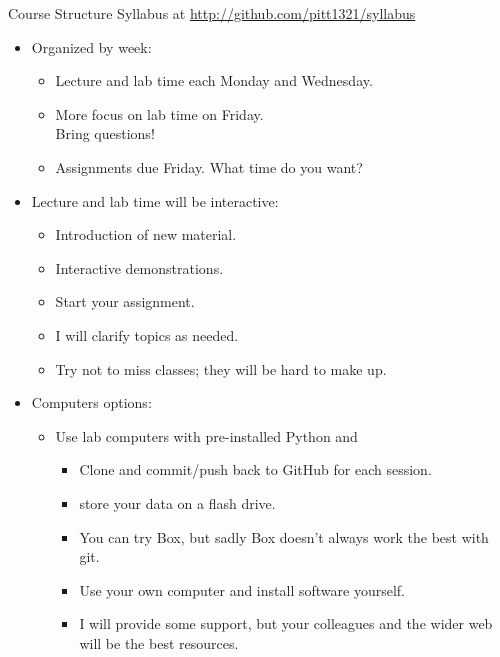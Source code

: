 \begin{frame}{Course Structure}
  Syllabus at \url{http://github.com/pitt1321/syllabus}
  \begin{itemize}
    \item Organized by week:
    \begin{itemize}
      \item Lecture and lab time each Monday and Wednesday.
      \item More focus on lab time on Friday.\\ Bring questions!
      \item Assignments due Friday.  What time do you want?
    \end{itemize}
    \item Lecture and lab time will be interactive:
    \begin{itemize}
      \item Introduction of new material.
      \item Interactive demonstrations.
      \item Start your assignment.
      \item I will clarify topics as needed.
      \item Try not to miss classes; they will be hard to make up.
    \end{itemize}
    \item Computers options:
    \begin{itemize}
      \item Use lab computers with pre-installed Python and 
      \begin{itemize}
        \item Clone and commit/push back to GitHub for each session.
        \item store your data on a flash drive.
        \item You can try Box, but sadly Box doesn't always work the best with git.
        \item Use your own computer and install software yourself.
        \item I will provide some support, but your colleagues and the wider web will be the best resources.
      \end{itemize}  
    \end{itemize}  
  \end{itemize}
\end{frame}



